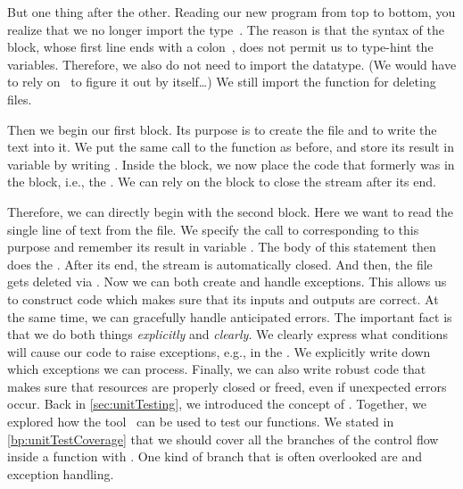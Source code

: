 But one thing after the other.
Reading our new program from top to bottom, you realize that we no longer import the type~.
The reason is that the syntax of the  block, whose first line ends with a colon~\pythonilIdx{:}, does not permit us to type-hint the variables.
Therefore, we also do not need to import the datatype.
(We would have to rely on \mypy\ to figure it out by itself\dots)
We still import the function  for deleting files.

Then we begin our first  block.
Its purpose is to create the file and to write the text into it.
We put the same call to the  function as before, and store its result in variable  by writing .
Inside the  block, we now place the code that formerly was in the  block, i.e., the .
We can rely on the  block to close the stream after its end.

Therefore, we can directly begin with the second  block.
Here we want to read the single line of text from the file.
We specify the call to  corresponding to this purpose and remember its result in variable .
The body of this  statement then does the .
After its end, the stream is automatically closed.
And then, the file gets deleted via .%
%
\FloatBarrier%
\endhsection%
%
%
Now we can both create and handle exceptions.
This allows us to construct code which makes sure that its inputs and outputs are correct.
At the same time, we can gracefully handle anticipated errors.
The important fact is that we do both things \emph{explicitly} and \emph{clearly}.
We clearly express what conditions will cause our code to raise exceptions, e.g., in the .
We explicitly write down which exceptions we can process.
Finally, we can also write robust code that makes sure that resources are properly closed or freed, even if unexpected errors occur.%
\endhsection%
\endhsection%
%
%
%
\label{sec:testingExceptions}%
%
Back in \cref{sec:unitTesting}, we introduced the concept of .
Together, we explored how the tool \pytest\ can be used to test our functions.
We stated in \cref{bp:unitTestCoverage} that we should cover all the branches of the control flow inside a function with .
One kind of branch that is often overlooked are  and exception handling.

